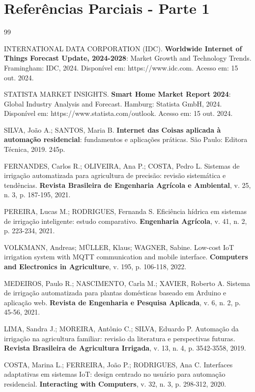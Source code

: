 \documentclass[twoside,english,brazilian]{UNISINOSmonografia}
\begin{document}
\chapter*{Referências Parciais - Parte 1}


\begin{thebibliography}{99}

INTERNATIONAL DATA CORPORATION (IDC). \textbf{Worldwide Internet of Things Forecast Update, 2024-2028}: Market Growth and Technology Trends. Framingham: IDC, 2024. Disponível em: https://www.idc.com. Acesso em: 15 out. 2024.

STATISTA MARKET INSIGHTS. \textbf{Smart Home Market Report 2024}: Global Industry Analysis and Forecast. Hamburg: Statista GmbH, 2024. Disponível em: https://www.statista.com/outlook. Acesso em: 15 out. 2024.

SILVA, João A.; SANTOS, Maria B. \textbf{Internet das Coisas aplicada à automação residencial}: fundamentos e aplicações práticas. São Paulo: Editora Técnica, 2019. 245p.

FERNANDES, Carlos R.; OLIVEIRA, Ana P.; COSTA, Pedro L. Sistemas de irrigação automatizada para agricultura de precisão: revisão sistemática e tendências. \textbf{Revista Brasileira de Engenharia Agrícola e Ambiental}, v. 25, n. 3, p. 187-195, 2021.

PEREIRA, Lucas M.; RODRIGUES, Fernanda S. Eficiência hídrica em sistemas de irrigação inteligente: estudo comparativo. \textbf{Engenharia Agrícola}, v. 41, n. 2, p. 223-234, 2021.

VOLKMANN, Andreas; MÜLLER, Klaus; WAGNER, Sabine. Low-cost IoT irrigation system with MQTT communication and mobile interface. \textbf{Computers and Electronics in Agriculture}, v. 195, p. 106-118, 2022.

MEDEIROS, Paulo R.; NASCIMENTO, Carla M.; XAVIER, Roberto A. Sistema de irrigação automatizada para plantas domésticas baseado em Arduino e aplicação web. \textbf{Revista de Engenharia e Pesquisa Aplicada}, v. 6, n. 2, p. 45-56, 2021.

LIMA, Sandra J.; MOREIRA, Antônio C.; SILVA, Eduardo P. Automação da irrigação na agricultura familiar: revisão da literatura e perspectivas futuras. \textbf{Revista Brasileira de Agricultura Irrigada}, v. 13, n. 4, p. 3542-3558, 2019.

COSTA, Marina L.; FERREIRA, João P.; RODRIGUES, Ana C. Interfaces adaptativas em sistemas IoT: design centrado no usuário para automação residencial. \textbf{Interacting with Computers}, v. 32, n. 3, p. 298-312, 2020.

\end{thebibliography}
\end{document}
